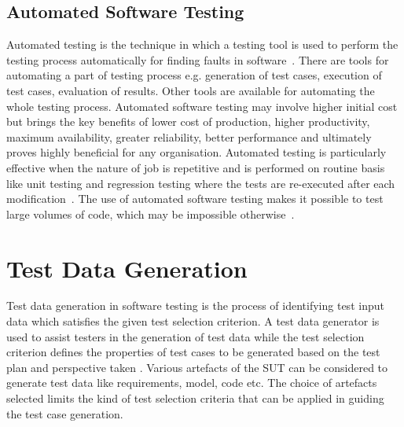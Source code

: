 \subsection{Automated Software Testing}
Automated testing is the technique in which a testing tool is used to perform the testing process automatically for finding faults in software~\cite{leitner2007reconciling}. There are tools for automating a part of testing process e.g. generation of test cases, execution of test cases, evaluation of results. Other tools are available for automating the whole testing process. 
Automated software testing may involve higher initial cost but brings the key benefits of lower cost of production, higher productivity, maximum availability, greater reliability, better performance and ultimately proves highly beneficial for any organisation. Automated testing is particularly effective when the nature of job is repetitive and is performed on routine basis like unit testing and regression testing where the tests are re-executed after each modification~\cite{huang2003automated}. The use of automated software testing makes it possible to test large volumes of code, which may be impossible otherwise~\cite{ramamoorthy1975testing}.

\section{Test Data Generation}
Test data generation in software testing is the process of identifying test input data which satisfies the given test selection criterion. A test data generator is used to assist testers in the generation of test data while the test selection criterion defines the properties of test cases to be generated based on the test plan and perspective taken \cite{korel1990automated}. Various artefacts of the SUT can be considered to generate test data like requirements, model, code etc. The choice of artefacts selected limits the kind of test selection criteria that can be applied in guiding the test case generation. 

